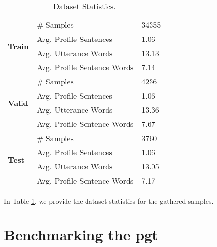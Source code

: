 \documentclass[11pt]{article}
\begin{document}
\begin{table}
\centering
\begin{tabular}{lll}
\hline
\multirow{4}{*}{\textbf{Train}} & \# Samples & 34355 \\
&Avg. Profile Sentences & 1.06 \\
&Avg. Utterance Words & 13.13 \\
&Avg. Profile Sentence Words & 7.14 \\
\hline
\multirow{4}{*}{\textbf{Valid}} & \# Samples & 4236 \\
&Avg. Profile Sentences & 1.06 \\
&Avg. Utterance Words & 13.36 \\
&Avg. Profile Sentence Words & 7.67 \\
\hline
\multirow{4}{*}{\textbf{Test}} & \# Samples & 3760 \\
&Avg. Profile Sentences & 1.06 \\
&Avg. Utterance Words & 13.05 \\
&Avg. Profile Sentence Words & 7.17 \\
\hline
\end{tabular}
\caption{Dataset Statistics.}
\label{tab:dataset-statistics}
\end{table}

In Table \ref{tab:dataset-statistics}, we provide the dataset statistics for the gathered samples.


\section{Benchmarking the \gls*{pgt}}
\end{document}
